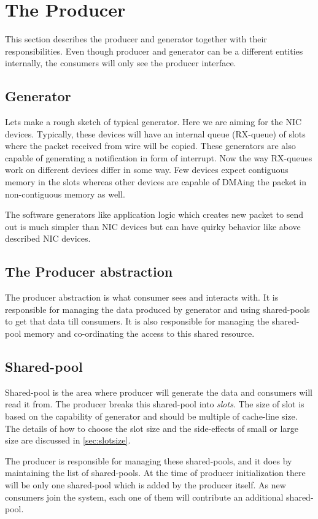 \documentclass[a4paper,twoside]{report} %
\begin{document}
\section{The Producer}
This section describes the producer and generator together with
their responsibilities.  Even though producer and generator can
be a different entities internally, the consumers will only see
the producer interface.

\subsection{Generator}
Lets make a rough sketch of typical generator.  Here we are aiming
for the NIC devices.  Typically, these devices will have an
internal queue (RX-queue) of slots where the packet received
from wire will be copied.  These generators are also capable
of generating a notification in form of interrupt.  Now the
way RX-queues work on different devices differ in some way.
Few devices expect contiguous memory in the slots whereas
other devices are capable of DMAing the packet in non-contiguous
memory as well.

	
The software generators like application
logic which creates new packet to send out is much simpler than
NIC devices but can have quirky behavior like above described
NIC devices.


\subsection{The Producer abstraction}
The producer abstraction is what consumer sees and interacts with.
It is responsible for managing the data produced by generator and
using shared-pools to get that data till consumers.  It is also
responsible for managing the shared-pool memory and co-ordinating 
the access to this shared resource.


\subsection{Shared-pool}
Shared-pool is the area where producer will generate the data
and consumers will read it from. The producer breaks this
shared-pool into \textit{slots}.  The size of slot
is based on the capability of generator and should be multiple of
cache-line size.  The details of how to choose
the slot size and the side-effects of small or large size are
discussed in \autoref{sec:slotsize}.


The producer is responsible for managing these shared-pools, and it
does by maintaining the list of shared-pools.  At the time of producer
initialization there will be only one shared-pool which is added by
the producer itself.  As new consumers join the system, each one of 
them will contribute an additional shared-pool.
\end{document}

